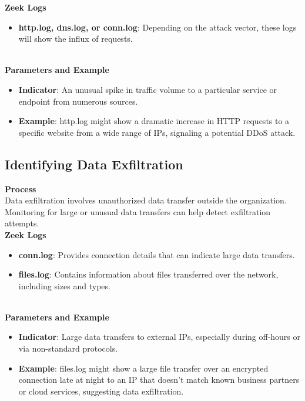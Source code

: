 \noindent \textbf{Zeek Logs}
\begin{itemize}
    \item \textbf{http.log, dns.log, or conn.log}: Depending on the attack vector, these logs will show the influx of requests.
\end{itemize}
\vspace{10pt}
\\

\noindent \textbf{Parameters and Example}
\begin{itemize}
    \item \textbf{Indicator}: An unusual spike in traffic volume to a particular service or endpoint from numerous sources.
    \item \textbf{Example}: http.log might show a dramatic increase in HTTP requests to a specific website from a wide range of IPs, signaling a potential DDoS attack.
\end{itemize}

\vspace{8pt}
\subsection{Identifying Data Exfiltration}
\textbf{Process}
\vspace{8pt}
\\
Data exfiltration involves unauthorized data transfer outside the organization. Monitoring for large or unusual data transfers can help detect exfiltration attempts.
\vspace{10pt}
\\

\noindent \textbf{Zeek Logs}
\begin{itemize}
    \item \textbf{conn.log}: Provides connection details that can indicate large data transfers.
    \item \textbf{files.log}: Contains information about files transferred over the network, including sizes and types.
\end{itemize}
\vspace{10pt}
\\

\noindent \textbf{Parameters and Example}
\begin{itemize}
    \item \textbf{Indicator}: Large data transfers to external IPs, especially during off-hours or via non-standard protocols.
    \item \textbf{Example}: files.log might show a large file transfer over an encrypted connection late at night to an IP that doesn't match known business partners or cloud services, suggesting data exfiltration.
\end{itemize}

